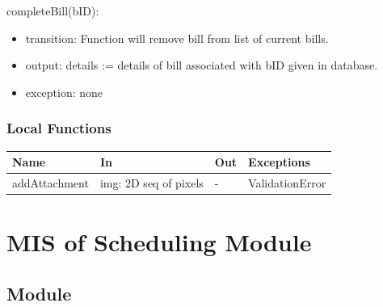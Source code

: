 \documentclass[12pt, titlepage]{article}
\begin{document}
\noindent completeBill(bID):
\begin{itemize}
\item transition: Function will remove bill from list of current bills.
\item output: details := details of bill associated with bID given in database.
\item exception: none
\end{itemize}


\subsubsection{Local Functions}

\begin{center}
\begin{tabular}{p{3cm} p{4cm} p{2cm} p{3cm}}
\hline
\textbf{Name} & \textbf{In} & \textbf{Out} & \textbf{Exceptions} \\
\hline
addAttachment & img: 2D seq of pixels & - & ValidationError \\
\hline
\end{tabular}
\end{center}



\section{MIS of Scheduling Module} \label{mB} 



\subsection{Module}
\end{document}
